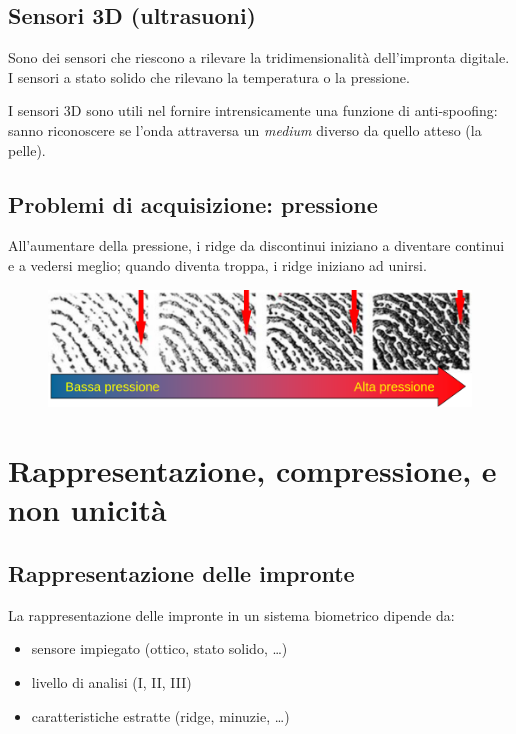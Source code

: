 \subsection{Sensori 3D (ultrasuoni)}

Sono dei sensori che riescono a rilevare la tridimensionalità dell'impronta digitale.
I sensori a stato solido che rilevano la temperatura o la pressione.

I sensori 3D sono utili nel fornire intrensicamente una funzione di anti-spoofing: 
sanno riconoscere se l'onda attraversa un \textit{medium} diverso da quello atteso (la pelle).

\subsection{Problemi di acquisizione: pressione}

All'aumentare della pressione, i ridge da discontinui iniziano a diventare continui e a vedersi
meglio; quando diventa troppa, i ridge iniziano ad unirsi.
\begin{figure}[ht]
    \centering
    \includegraphics[width=0.75\linewidth]{images-chap5/pressione.png}
\end{figure}

\section{Rappresentazione, compressione,  e non unicità}

\subsection{Rappresentazione delle impronte}

La rappresentazione delle impronte in un sistema biometrico dipende da:
\begin{itemize}
    \item sensore impiegato (ottico, stato solido, \dots)
    \item livello di analisi (I, II, III)
    \item caratteristiche estratte (ridge, minuzie, \dots)
\end{itemize}


